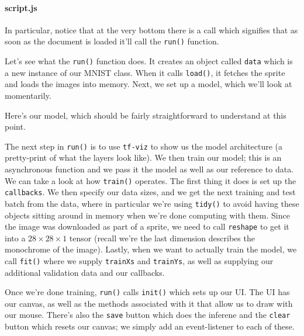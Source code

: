 \documentclass[12pt]{article}
\begin{document}
% 

\paragraph{script.js}
In particular, notice that at the very bottom there is a call which signifies that as soon as the document is loaded it'll call the \texttt{run()} function.



Let's see what the \texttt{run()} function does. It creates an object called \texttt{data} which is a new instance of our MNIST class. When it calls \texttt{load()}, it fetches the sprite and loads the images into memory. Next, we set up a model, which we'll look at momentarily.

Here's our model, which should be fairly straightforward to understand at this point.



The next step in \texttt{run()} is to use \texttt{tf-viz} to show us the model architecture (a pretty-print of what the layers look like). We then train our model; this is an asynchronous function and we pass it the model as well as our reference to data. We can take a look at how \texttt{train()} operates. The first thing it does is set up the \texttt{callbacks}. We then specify our data sizes, and we get the next training and test batch from the data, where in particular we're using \texttt{tidy()} to avoid having these objects sitting around in memory when we're done computing with them. Since the image was downloaded as part of a sprite, we need to call \texttt{reshape} to get it into a $28 \times 28 \times 1$ tensor (recall we're the last dimension describes the monochrome of the image). Lastly, when we want to actually train the model, we call \texttt{fit()} where we supply \texttt{trainXs} and \texttt{trainYs}, as well as supplying our additional validation data and our callbacks.


Once we're done training, \texttt{run()} calls \texttt{init()} which sets up our UI. The UI has our canvas, as well as the methods associated with it that allow us to draw with our mouse. There's also the \texttt{save} button which does the inferene and the \texttt{clear} button which resets our canvas; we simply add an event-listener to each of these. 

\end{document}
